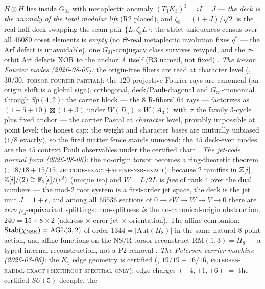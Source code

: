 $H\otimes H$ lies inside $G_{31}$ with metaplectic anomaly
$(T_3K_3)^3=iI=J$ --- \emph{the deck is the anomaly of the total
modular lift} (R2 placed), and $\zeta_8=(1{+}J)/\sqrt2$ is the
real half-deck swapping the seam pair $\{L,\zeta_8L\}$; the strict
uniqueness census over all $46080$ coset elements is \emph{empty}
(no $\Theta$-real metaplectic involution fixes $q^{*}$ --- the Arf
defect is unavoidable), one $G_{31}$-conjugacy class survives
retyped, and the $\sigma$-orbit Arf defects XOR to the anchor $A$
itself (R3 named, not fixed) \mE.
\emph{The torsor Fourier modes (2026-08-06):} the origin-free
fibers are read at character level
(, $30/30$,
\textsc{torsor-fourier-partial}): the $120$ projective Fourier
rays are canonical (an origin shift is a global sign), orthogonal,
deck/Pauli-diagonal and $G_{31}$-monomial through $Sp(4,2)$; the
carrier block --- the $8$ R-fibers' $64$ rays --- factorizes as
$(1{+}5{+}10)\boxtimes(1{+}3)$ under $W(D_5)\times W(A_3)$ with
$\sigma$ the family $3$-cycle plus fixed anchor --- the carrier
Pascal at \emph{character} level, provably impossible at point
level; the honest cap: the weight and character bases are mutually
unbiased ($1/8$ exactly), so the fired matter fence stands
unmoved; the $45$ deck-even modes are the $45$ context Pauli
observables under the certified chart \mE.
\emph{The jet-code normal form (2026-08-06):} the no-origin
torsor becomes a ring-theoretic theorem
(, $18/18+15/15$,
\textsc{jetcode-exact}$+$\textsc{affine-nsr-exact}): because $2$
ramifies in $\mathbb{Z}[i]$,
$\mathbb{Z}[i]/(2)\cong\mathbb F_2[\epsilon]/(\epsilon^2)$ (unique iso)
and $W=L/2L$ is \emph{free} of rank $4$ over the dual numbers ---
the mod-2 root system is a first-order jet space, the deck is the
jet unit $J=1{+}\epsilon$, and among all $65536$ sections of
$0\to\epsilon W\to W\to V\to0$ there are \emph{zero}
$\mu_4$-equivariant splittings: non-splitness \emph{is} the
no-canonical-origin obstruction; $240=15\times8\times2$ (address
$\times$ error jet $\times$ orientation).  The affine companion:
$\mathrm{Stab}(\chi_{\rm NSR})=\mathrm{AGL}(3,2)$ of order
$1344=|\mathrm{Aut}(H_8)|$ in the same natural 8-point action,
and affine functions on the NS/R torsor reconstruct
$\mathrm{RM}(1,3)=H_8$ --- a typed internal reconstruction, not a
P2 removal \mE.
\emph{The Petersen carrier machine (2026-08-06):} the $K_5$ edge
geometry is certified
(, $19/19+16/16$,
\textsc{petersen-radial-exact}$+$\textsc{sixthroot-spectral-only}):
edge charges $(-4,+1,+6)$ $=$ the certified $SU(5)$ decuple, the
